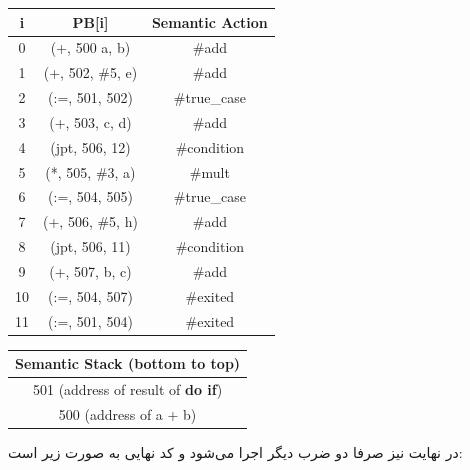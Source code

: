 \documentclass[]{article}
\begin{document}
\begin{latin}
\centering
\begin{tabular}{|c|c|c|}
    \hline
    i & PB[i] & Semantic Action\\
    \hline
    0 & (+, 500 a, b) & \#add\\
    1 & (+, 502, \#5, e) & \#add\\
    2 & (:=, 501, 502) & \#true\_case\\
    3 & (+, 503, c, d) & \#add\\
    4 & (jpt, 506, 12) & \#condition\\
    5 & (*, 505, \#3, a) & \#mult\\
    6 & (:=, 504, 505) & \#true\_case\\
    7 & (+, 506, \#5, h) & \#add\\
    8 & (jpt, 506, 11) & \#condition\\
    9 & (+, 507, b, c) & \#add\\
    10 & (:=, 504, 507) & \#exited\\
    11 & (:=, 501, 504) & \#exited\\
    \hline
\end{tabular}
\begin{tabular}{|c|}
    \hline
    Semantic Stack (bottom to top)\\
    \hline
    501 (address of result of \textbf{do if})\\
    \hline
    500 (address of a + b)\\
    \hline
\end{tabular}
\end{latin}
در نهایت نیز صرفا دو ضرب دیگر اجرا می‌شود و کد نهایی به صورت زیر است:
\end{document}
